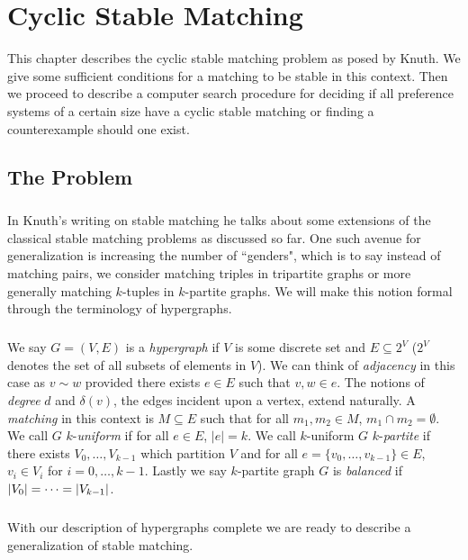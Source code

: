 \chapter{Cyclic Stable Matching}
This chapter describes the cyclic stable matching problem as posed by Knuth. We give some sufficient conditions for a matching to be stable in this context. Then we proceed to describe a computer search procedure for deciding if all preference systems of a certain size have a cyclic stable matching or finding a counterexample should one exist. 
\section{The Problem}
\paragraph{}
In Knuth's writing on stable matching \cite{knuth1997stable} he talks about some extensions of the classical stable matching problems as discussed so far. One such avenue for generalization is increasing the number of ``genders", which is to say instead of matching pairs, we consider matching triples in tripartite graphs or more generally matching $k$-tuples in $k$-partite graphs. We will make this notion formal through the terminology of hypergraphs.

\paragraph{}We say $G=(V,E)$ is a {\it hypergraph} if $V$ is some discrete set and $E \subseteq 2^V$ ($2^V$ denotes the set of all subsets of elements in $V$). We can think of {\it adjacency} in this case as $v \sim w$ provided there exists $e \in E$ such that $v, w \in e$. The notions of {\it degree} $d$ and $\delta(v)$, the edges incident upon a vertex, extend naturally. A {\it matching} in this context is $M \subseteq E$ such that for all $m_1, m_2 \in M$, $m_1 \cap m_2 = \emptyset$. We call $G$ $k$-{\it uniform} if for all $e \in E$, $|e| = k$. We call $k$-uniform $G$ $k$-{\it partite} if there exists $V_0, \dots, V_{k-1}$ which partition $V$ and for all $e=\{v_0, \dots, v_{k-1}\} \in E$, $v_i \in V_i$ for $i = 0,\dots, k-1$. Lastly we say $k$-partite graph $G$ is {\it balanced} if $\left|V_0\right| = \dots = \left|V_{k-1}\right|$.

\paragraph{}
With our description of hypergraphs complete we are ready to describe a generalization of stable matching.

